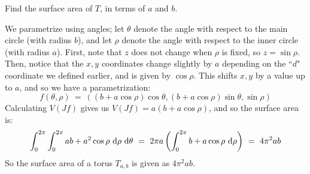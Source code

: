 \begin{qu}[num=41.3]
    Find the surface area of $ T $, in terms of $ a $ and $ b $.
\end{qu}

\begin{soln}
    We parametrize using angles; let $ \theta $ denote the angle with respect to
    the main circle (with radius $ b $), and let $ \rho $ denote the angle with
    respect to the inner circle (with radius $ a $). First, note that $ z $ does
    not change when $ \rho $ is fixed, so $ z = \sin\rho $. \vsp
    Then, notice that the $ x, y $ coordinates change slightly by $ a $
    depending on the ``$ d $" coordinate we defined earlier, and is given by
    $ \cos\rho $. This shifts $ x,y $ by a value up to $ a $, and so we have a
    parametrization:
    \begin{equation*}
        f(\theta,\rho) \ = \ ((b+a\cos\rho)\cos\theta, (b+a\cos\rho)\sin\theta,
        \sin\rho)
    \end{equation*}
    Calculating $ V(Jf) $ gives us $ V(Jf) = a(b+a\cos\rho) $, and so the
    surface area is:
    \begin{equation*}
        \int_{0}^{2\pi}\int_{0}^{2\pi}ab+a^{2}\cos\rho\textrm{ d}\rho\textrm{ d}\theta \ = \
        2\pi a \left( \int_{0}^{2\pi}b+a\cos\rho\textrm{ d}\rho \right) \ = \
        4\pi^{2}ab
    \end{equation*}
    So the surface area of a torus $ T_{a,b} $ is given as $ 4\pi^{2}ab $.
\end{soln}

